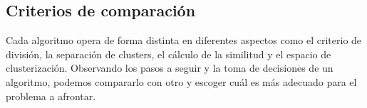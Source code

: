 \documentclass[10pt, a4paper]{article}
\begin{document}


\subsection{\textbf{Criterios de comparación}} \label{subsec:Criterios de comparación}

\cite{LIBRO} Cada algoritmo opera de forma distinta en diferentes aspectos como el criterio de división, la separación de clusters, el cálculo de la similitud y el espacio de clusterización. Observando los pasos a seguir y la toma de decisiones de un algoritmo, podemos compararlo con otro y escoger cuál es más adecuado para el problema a afrontar. 
\end{document}
